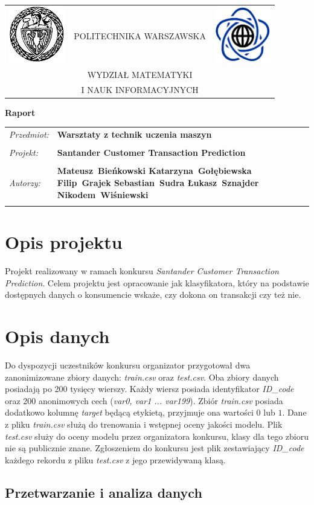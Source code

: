 \documentclass[12pt]{article}
\renewcommand{\maketitle}{
\begin{titlepage}
\begin{table}[t]
\centering
\begin{tabular}[t]{lcr}
 \includegraphics[width=70pt,height=70pt]{PW} & POLITECHNIKA WARSZAWSKA & \includegraphics[width=70pt,height=70pt]{MiNI}\\
& WYDZIAŁ MATEMATYKI & \\
& I NAUK INFORMACYJNYCH &
\end{tabular}
\end{table}
\vspace*{3cm}
  \begin{center}
    \LARGE
    \textbf {Raport}\\
   \vspace*{2 cm}
\begin{table}[!htp]
\begin{tabular}{p{4cm}p{10cm}}
\textit{Przedmiot:} &\textbf {Warsztaty z technik uczenia maszyn} \\
\\
\textit{Projekt:} &\textbf {Santander Customer Transaction Prediction} \\
\\
\textit{Autorzy:} &\textbf {Mateusz~Bieńkowski \newline
	Katarzyna~Gołębiewska \newline
	Filip~Grajek \newline
	Sebastian~Sudra \newline
	Łukasz~Sznajder \newline
	Nikodem~Wiśniewski \newline 
 } \\
\\
\end{tabular}
\end{table}

\vspace{5 cm}
  \center{\small Warszawa, dnia \today}
\end{center}
\end{titlepage}
}
\begin{document}
\maketitle

\newpage

\section{Opis projektu}

Projekt realizowany w ramach konkursu \textit{Santander Customer Transaction Prediction}\cite{santanderkaggle}. Celem projektu jest opracowanie jak klasyfikatora, który na podstawie dostępnych danych o konsumencie wskaże, czy dokona on transakcji czy też nie. 

\section{Opis danych}

Do dyspozycji uczestników konkursu organizator przygotował dwa zanonimizowane zbiory danych: \textit{train.csv} oraz \textit{test.csv}. Oba zbiory danych posiadają po 200 tysięcy wierszy. Każdy wiersz posiada identyfikator \textit{ID\_code} oraz 200 anonimowych cech (\textit{var0, var1 ... var199}). Zbiór \textit{train.csv} posiada dodatkowo kolumnę \textit{target} będącą etykietą, przyjmuje ona wartości $0$ lub $1$. Dane z pliku \textit{train.csv} służą do trenowania i wstępnej oceny jakości modelu. Plik \textit{test.csv} służy do oceny modelu przez organizatora konkursu, klasy dla tego zbioru nie są publicznie znane. Zgłoszeniem do konkursu jest plik zestawiający \textit{ID\_code} każdego rekordu z pliku \textit{test.csv} z jego przewidywaną klasą.


\subsection{Przetwarzanie i analiza danych}
\end{document}
